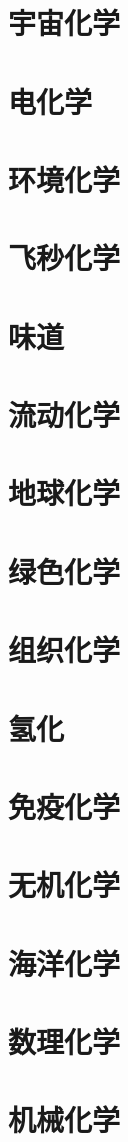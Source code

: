 \section{宇宙化学}
\section{电化学}
\section{环境化学}
\section{飞秒化学}
\section{味道}
\section{流动化学}
\section{地球化学}
\section{绿色化学}
\section{组织化学}
\section{氢化}
\section{免疫化学}
\section{无机化学}
\section{海洋化学}
\section{数理化学}
\section{机械化学}

